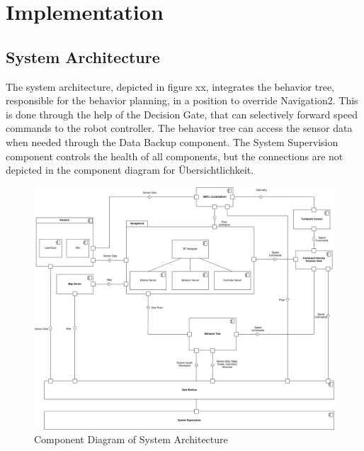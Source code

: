 \chapter{Implementation}
\label{cha:implementierung}

\section{System Architecture}

The system architecture, depicted in figure xx, integrates the behavior tree, responsible for the behavior planning, in a position to override Navigation2. This is done through the help of the Decision Gate, that can selectively forward speed commands to the robot controller. 
The behavior tree can access the sensor data when needed through the Data Backup component. The System Supervision component controls the health of all components, but the connections are not depicted in the component diagram for Übersichtlichkeit.

\begin{figure}[h!]
	\includegraphics[width=1.05\textwidth]{images/component_diagram_bt.png}
	\caption{Component Diagram of System Architecture}
\end{figure}

